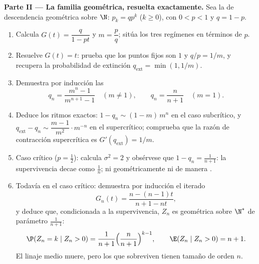 \begin{problem}
\medskip
\noindent\textbf{Parte II --- La familia geométrica, resuelta
exactamente.} Sea la  de descendencia geométrica sobre $\N$: $p_k
= qp^k$ ($k \geq 0$), con $0 < p < 1$ y $q = 1 - p$.
\begin{enumerate}[resume]
  \item Calcula $G(t) = \dfrac{q}{1 - pt}$ y $m = \dfrac pq$; sitúa
        los tres regímenes en términos de $p$.
  \item Resuelve $G(t) = t$: prueba que los puntos fijos son $1$ y
        $q/p = 1/m$, y recupera la probabilidad de extinción
        $q_{\mathrm{ext}} = \min(1, 1/m)$.
  \item Demuestra por inducción las 
        \[
        q_n = \frac{m^n - 1}{m^{n+1} - 1} \quad (m \neq 1),
        \qquad
        q_n = \frac{n}{n+1} \quad (m = 1).
        \]
  \item Deduce los ritmos exactos: $1 - q_n \sim (1 - m)\,m^n$ en el
        caso subcrítico, y $q_{\mathrm{ext}} - q_n \sim \dfrac{m -
        1}{m^{2}}\cdot m^{-n}$ en el supercrítico; comprueba que la
        razón de contracción supercrítica es $G'(q_{\mathrm{ext}}) =
        1/m$.
  \item Caso crítico ($p = \tfrac12$): calcula $\sigma^2 = 2$ y
        obsérvese que $1 - q_n = \frac1{n+1}$: la supervivencia decae
        como $\frac1n$; ni geométricamente ni de manera .
  \item Todavía en el caso crítico: demuestra por inducción el
        iterado 
        \[
        G_n(t) = \frac{n - (n-1)t}{n + 1 - nt},
        \]
        y deduce que, condicionada a la supervivencia, $Z_n$ es
        geométrica sobre $\N^*$ de parámetro $\frac1{n+1}$:
        \[
        \P(Z_n = k \mid Z_n > 0) = \frac1{n+1}
        \Bigl(\frac{n}{n+1}\Bigr)^{k-1},
        \qquad
        \E(Z_n \mid Z_n > 0) = n + 1 .
        \]
        El linaje medio muere, pero los que sobreviven tienen tamaño
        de orden $n$.
\end{enumerate}


\end{problem}
